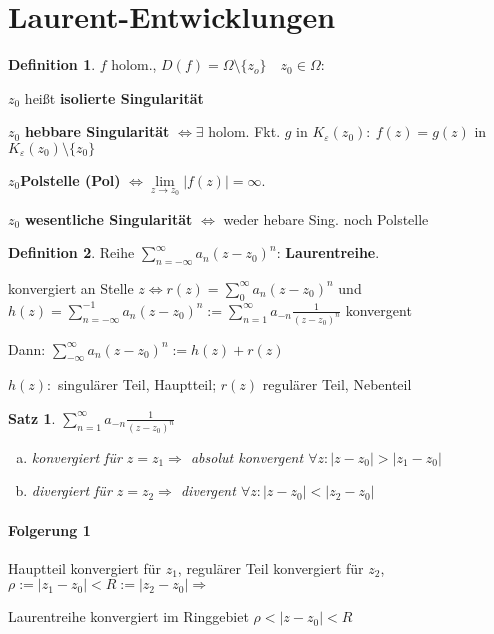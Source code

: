 \documentclass[ngerman,halfparskip]{scrartcl}
\newtheorem*{satz}{Satz}
\theoremstyle{definition}
\newtheorem*{defin}{Definition}
\begin{document}
\section{Laurent-Entwicklungen}
\begin{defin}
$f$ holom., $D(f)=\Omega\setminus \{z_o\} \quad z_0\in\Omega:$

$z_0$ heißt \textbf{isolierte Singularität}

$z_0$ \textbf{hebbare Singularität} $\Leftrightarrow \exists$ holom. Fkt. $g$ in $K_\varepsilon(z_0): ~ f(z)=g(z) $ in $K_\varepsilon(z_0)\setminus\{z_0\}$

$z_0$\textbf{Polstelle (Pol)} $\Leftrightarrow \lim\limits_{z\rightarrow z_0}|f(z)|=\infty.$

$z_0$ \textbf{wesentliche Singularität} $\Leftrightarrow$ weder hebare Sing. noch Polstelle
\end{defin}


\begin{defin}
Reihe $\sum\limits_{n=-\infty}^{\infty}a_n(z-z_0)^n$: \textbf{Laurentreihe}.

konvergiert an Stelle $z \Leftrightarrow r(z)=\sum\limits_0^\infty a_n (z-z_0)^n$ und $h(z)=\sum\limits_{n=-\infty}^{-1} a_n (z-z_0)^n:=\sum\limits_{n=1}^\infty a_{-n}\frac 1{(z-z_0)^n}$ konvergent

Dann: $\sum\limits_{-\infty}^\infty a_n(z-z_0)^n:=h(z)+r(z)$

$h(z):$ singulärer Teil, Hauptteil; $r(z)$ regulärer Teil, Nebenteil
\end{defin}

\begin{satz}$\sum\limits_{n=1}^\infty a_{-n}\frac 1{(z-z_0)^n}$
\begin{enumerate}[a)]
\item konvergiert für $z=z_1 \Rightarrow$ absolut konvergent $\forall z: |z-z_0|>|z_1-z_0|$
\item divergiert für $z=z_2 \Rightarrow$ divergent $\forall z: |z-z_0|<|z_2-z_0|$
\end{enumerate}
\end{satz}

\paragraph*{Folgerung 1} Hauptteil konvergiert für $z_1$, regulärer Teil konvergiert für $z_2$, $\rho:=|z_1-z_0|<R:=|z_2-z_0| \Rightarrow$

Laurentreihe konvergiert im Ringgebiet $\rho<|z-z_0|<R$
\end{document}
